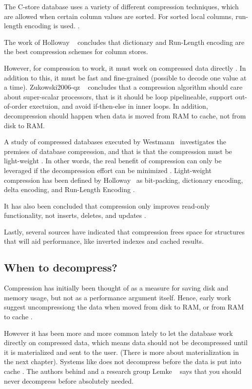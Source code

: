 The C-store database uses a variety of different compression techniques, which are allowed when certain column values are sorted. For sorted local columns, run-length encoding is used. .

The work of Holloway \ea~\cite{Holloway2008-rr} concludes that dictionary and Run-Length encoding are the best compression schemes for column stores.

However, for compression to work, it must work on compressed data directly \cite{Lemke2010-is}. In addition to this, it must be fast and fine-grained (possible to decode one value at a time). Zukowski2006-qz \ea~\cite{Zukowski2006-oz} concludes that a compression algorithm should care about super-scalar processors, that is it should be loop pipelineable, support out-of-order exectuion, and avoid if-then-else in inner loops. In addition, decompression should happen when data is moved from RAM to cache, not from disk to RAM. 

A study of compressed databases executed by Westmann \ea~investigates the premises of database compression, and that is that the compression must be light-weight \cite{Westmann2000-mz}. In other words, the real benefit of compression can only be leveraged if the decompression effort can be minimized \cite{Lemke2010-is}. Light-weight compression has been defined by Holloway \ea~as bit-packing, dictionary encoding, delta encoding, and Run-Length Encoding \cite{Holloway2008-rr}.

It has also been concluded that compression only improves read-only functionality, not inserts, deletes, and updates \cite{Westmann200-mz}.

Lastly, several sources \cite{Lamb2012-kg, Lahiri2015-mz} have indicated that compression frees space for structures that will aid performance, like inverted indexes and cached results.

\subsection{When to decompress?}
\label{sub:When to decompress?}
Compression has initially been thought of as a measure for saving disk and memory usage, but not as a performance argument itself. Hence, early work suggest uncompressiong the data when moved from disk to RAM, or from RAM to cache \cite{Zukowski2006-oz}. 

However it has been more and more common lately to let the database work directly on compressed data, which means data should not be decompressed until it is materialized and sent to the user. (There is more about materialization in the next chapter). Systems like \monetx does not decompress before the data is put into cache \cite{Johnson2008-cp}. The authors behind \blink \cite{Barber2012-xt} and a research group Lemke \ea~\cite{Lemke2010-is} says that you should never decompress before absolutely needed. 



